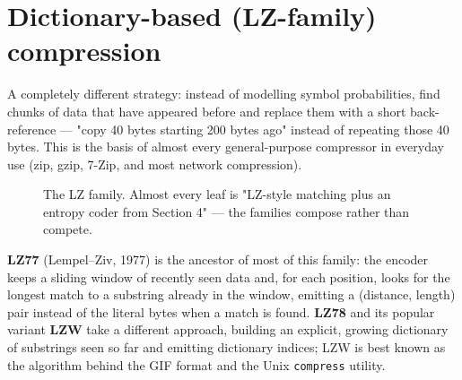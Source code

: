 \documentclass[11pt]{article}
\begin{document}
\section{Dictionary-based (LZ-family) compression}

A completely different strategy: instead of modelling symbol probabilities, find chunks of data that have appeared before and replace them with a short back-reference — "copy 40 bytes starting 200 bytes ago" instead of repeating those 40 bytes. This is the basis of almost every general-purpose compressor in everyday use (zip, gzip, 7-Zip, and most network compression).

\begin{figure}[h]
\centering
{}
\caption{The LZ family. Almost every leaf is "LZ-style matching plus an entropy coder from Section 4" — the families compose rather than compete.}
\end{figure}

\textbf{LZ77} (Lempel--Ziv, 1977) is the ancestor of most of this family: the encoder keeps a sliding window of recently seen data and, for each position, looks for the longest match to a substring already in the window, emitting a (distance, length) pair instead of the literal bytes when a match is found. \textbf{LZ78} and its popular variant \textbf{LZW} take a different approach, building an explicit, growing dictionary of substrings seen so far and emitting dictionary indices; LZW is best known as the algorithm behind the GIF format and the Unix \texttt{compress} utility.
\end{document}
